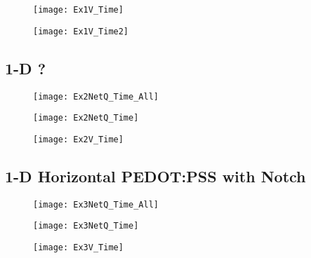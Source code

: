 \begin{landscape}
\begin{figure}[!htp]
\centering
\texttt{[image: Ex1V\_Time]}
\caption{} 
\label{}
\end{figure}
\end{landscape}

\begin{landscape}
\begin{figure}[!htp]
\centering
\texttt{[image: Ex1V\_Time2]}
\caption{} 
\label{}
\end{figure}
\end{landscape}

\clearpage
\subsection{1-D ?}
\begin{figure}[!htp]
\centering
\texttt{[image: Ex2NetQ\_Time\_All]}
\caption{} 
\label{}
\end{figure}


\begin{landscape}
\begin{figure}[!htp]
\centering
\texttt{[image: Ex2NetQ\_Time]}
\caption{} 
\label{}
\end{figure}
\end{landscape}

\begin{landscape}
\begin{figure}[!htp]
\centering
\texttt{[image: Ex2V\_Time]}
\caption{} 
\label{}
\end{figure}
\end{landscape}

\clearpage
\subsection{1-D Horizontal PEDOT:PSS with Notch}
\begin{figure}[!htp]
\centering
\texttt{[image: Ex3NetQ\_Time\_All]}
\caption{} 
\label{}
\end{figure}


\begin{landscape}
\begin{figure}[!htp]
\centering
\texttt{[image: Ex3NetQ\_Time]}
\caption{} 
\label{}
\end{figure}
\end{landscape}

\begin{landscape}
\begin{figure}[!htp]
\centering
\texttt{[image: Ex3V\_Time]}
\caption{} 
\label{}
\end{figure}
\end{landscape}

